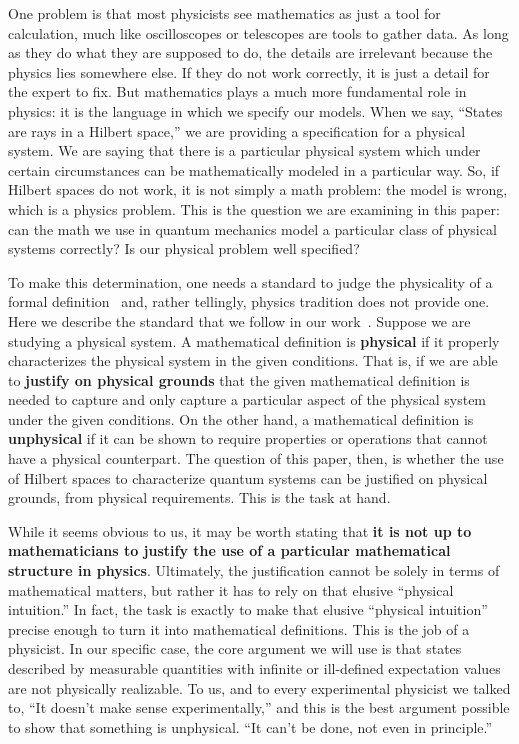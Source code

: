 \documentclass[10pt,twocolumn, nofootinbib]{revtex4-2}
\begin{document}
One problem is that most physicists see mathematics as just a tool for calculation, much like oscilloscopes or telescopes are tools to gather data. As long as they do what they are supposed to do, the details are irrelevant because the physics lies somewhere else. If they do not work correctly, it is just a detail for the expert to fix. But mathematics plays a much more fundamental role in physics: it is the language in which we specify our models. When we say, ``States are rays in a Hilbert space,'' we are providing a specification for a physical system.  We are saying that there is a particular physical system which under certain circumstances can be mathematically modeled in a particular way.  So, if Hilbert spaces do not work, it is not simply a math problem: the model is wrong, which is a physics problem.  This is the question we are examining in this paper: can the math we use in quantum mechanics model a particular class of physical systems correctly?  Is our physical problem well specified?

To make this determination, one needs a standard to judge the physicality of a formal definition~\cite{redei_tension_2020, north_physics_2021} and, rather tellingly, physics tradition does not provide one. Here we describe the standard that we follow in our work~\cite{aop-book}.  Suppose we are studying a physical system. A mathematical definition is \textbf{physical} if it properly characterizes the physical system in the given conditions. That is, if we are able to \textbf{justify on physical grounds} that the given mathematical definition is needed to capture and only capture a particular aspect of the physical system under the given conditions. On the other hand, a mathematical definition is \textbf{unphysical} if it can be shown to require properties or operations that cannot have a physical counterpart. The question of this paper, then, is whether the use of Hilbert spaces to characterize quantum systems can be justified on physical grounds, from physical requirements. This is the task at hand.

While it seems obvious to us, it may be worth stating that \textbf{it is not up to mathematicians to justify the use of a particular mathematical structure in physics}. Ultimately, the justification cannot be solely in terms of mathematical matters, but rather it has to rely on that elusive ``physical intuition.'' In fact, the task is exactly to make that elusive ``physical intuition'' precise enough to turn it into mathematical definitions. This is the job of a physicist. In our specific case, the core argument we will use is that states described by measurable quantities with infinite or ill-defined expectation values are not physically realizable. To us, and to every experimental physicist we talked to, ``It doesn't make sense experimentally,'' and this is the best argument possible to show that something is unphysical. ``It can't be done, not even in principle.'' 
\end{document}
